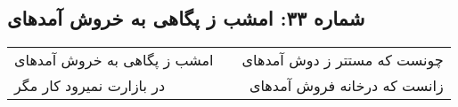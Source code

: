\begin{center}
\section*{شماره ۳۳: امشب ز پگاهی به خروش آمدهای}
\label{sec:033}
\begin{longtable}{l p{0.5cm} r}
امشب ز پگاهی به خروش آمدهای
&&
چونست که مستتر ز دوش آمدهای
\\
در بازارت نمیرود کار مگر
&&
زانست که درخانه فروش آمدهای
\\
\end{longtable}
\end{center}
